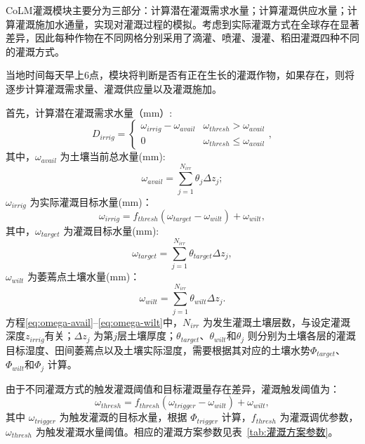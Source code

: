 CoLM灌溉模块主要分为三部分：计算潜在灌溉需求水量；计算灌溉供应水量；计算灌溉施加水通量，实现对灌溉过程的模拟。考虑到实际灌溉方式在全球存在显著差异，因此每种作物在不同网格分别采用了滴灌、喷灌、漫灌、稻田灌溉四种不同的灌溉方式。

当地时间每天早上6点，模块将判断是否有正在生长的灌溉作物，如果存在，则将逐步计算灌溉需求量、灌溉供应量以及灌溉施加。

首先，计算潜在灌溉需求水量（mm）:
\begin{equation}
    D_{irrig} = \begin{cases}
        \omega_{irrig} - \omega_{avail} & \omega_{thresh} > \omega_{avail} \\
        0     & \omega_{thresh} \leqslant \omega_{avail}
    \end{cases},
\end{equation}
其中，$\omega_{avail}$ 为土壤当前总水量(mm):
\begin{equation}\label{eq:omega-avail}
    \omega_{avail} = \sum_{j=1}^{N_{irr}}\theta_j\Delta z_j;
\end{equation}
$\omega_{irrig}$ 为实际灌溉目标水量(mm)：
\begin{equation}
    \omega_{irrig} = f_{thresh}(\omega_{target}-\omega_{wilt}) + \omega_{wilt}, 
\end{equation}
其中，$\omega_{target}$ 为灌溉目标水量(mm): 
\begin{equation}
    \omega_{target} = \sum_{j=1}^{N_{irr}}\theta_{target}\Delta z_j,
\end{equation}
$\omega_{wilt}$ 为萎蔫点土壤水量(mm)：
\begin{equation}\label{eq:omega-wilt}
    \omega_{wilt} = \sum_{j=1}^{N_{irr}}\theta_{wilt}\Delta z_j.
\end{equation}
方程\eqref{eq:omega-avail}--\eqref{eq:omega-wilt}中，$N_{irr}$ 为发生灌溉土壤层数，与设定灌溉深度$z_{irrig}$有关；$\Delta z_j$ 为第$j$层土壤厚度；$\theta_{target}$、$\theta_{wilt}$和$\theta_j$ 则分别为土壤各层的灌溉目标湿度、田间萎蔫点以及土壤实际湿度，需要根据其对应的土壤水势$\Phi_{target}$、 $\Phi_{wilt}$和$\Phi_j$ 计算。

由于不同灌溉方式的触发灌溉阈值和目标灌溉量存在差异，灌溉触发阈值为：
\begin{equation}
    \omega_{thresh} = f_{thresh}(\omega_{trigger}-\omega_{wilt}) + \omega_{wilt},
\end{equation}
其中 $\omega_{trigger}$ 为触发灌溉的目标水量，根据 $\Phi_{trigger}$ 计算，$f_{thresh}$ 为灌溉调优参数，$\omega_{thresh}$ 为触发灌溉水量阈值。相应的灌溉方案参数见表~\ref{tab:灌溉方案参数}。

